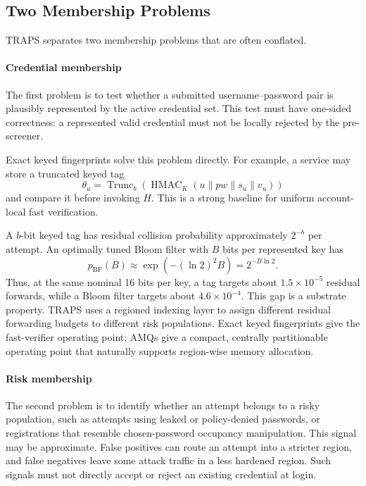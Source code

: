 \subsection{Two Membership Problems}

TRAPS separates two membership problems that are often conflated.

\paragraph{Credential membership}
The first problem is to test whether a submitted username--password pair is plausibly represented by the active credential set. This test must have one-sided correctness: a represented valid credential must not be locally rejected by the pre-screener.

Exact keyed fingerprints solve this problem directly. For example, a service may store a truncated keyed tag
\[
\theta_u
=
\operatorname{Trunc}_b
\left(
\operatorname{HMAC}_{K}
\left(
u\parallel pw\parallel s_u\parallel v_u
\right)
\right)
\]
and compare it before invoking \(H\). This is a strong baseline for uniform account-local fast verification.

A \(b\)-bit keyed tag has residual collision probability approximately \(2^{-b}\) per attempt. An optimally tuned Bloom filter with \(B\) bits per represented key has
\[
p_{\mathrm{BF}}(B)\approx \exp\!\left(-(\ln 2)^2B\right)=2^{-B\ln 2}.
\]
Thus, at the same nominal 16 bits per key, a tag targets about \(1.5\times10^{-5}\) residual forwards, while a Bloom filter targets about \(4.6\times10^{-4}\). This gap is a substrate property. TRAPS uses a regioned indexing layer to assign different residual forwarding budgets to different risk populations. Exact keyed fingerprints give the fast-verifier operating point; AMQs give a compact, centrally partitionable operating point that naturally supports region-wise memory allocation.

\paragraph{Risk membership}
The second problem is to identify whether an attempt belongs to a risky population, such as attempts using leaked or policy-denied passwords, or registrations that resemble chosen-password occupancy manipulation. This signal may be approximate. False positives can route an attempt into a stricter region, and false negatives leave some attack traffic in a less hardened region. Such signals must not directly accept or reject an existing credential at login.

